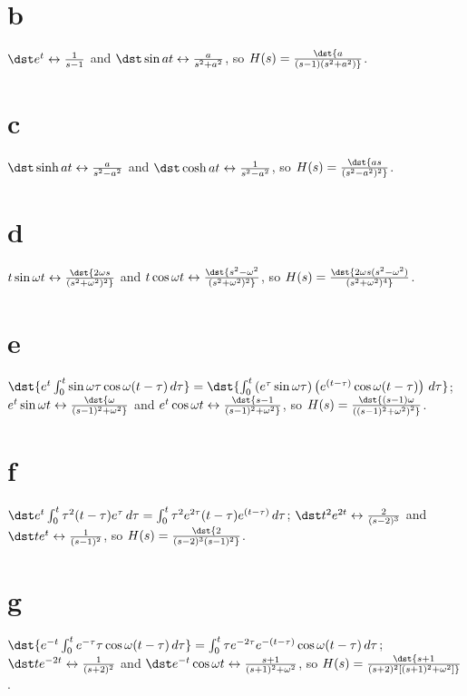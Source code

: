 \documentclass[dvips]{book}
\numberwithin{example}{section}
\numberwithin{equation}{section}
\numberwithin{theorem}{section}
\numberwithin{table}{section}
\numberwithin{figure}{section}
\begin{document}
\part{b}  $\dst e^t\leftrightarrow{1\over s-1}$ and
$\dst\sin at\leftrightarrow{a\over s^2+a^2}$, so
$H(s)=\dst{a\over(s-1)(s^2+a^2)}$.

\part{c}   $\dst\sinh at\leftrightarrow{a\over s^2-a^2}$ and
$\dst\cosh at\leftrightarrow{1\over s^2-a^2}$, so
$H(s)=\dst{as\over(s^2-a^2)^2}$.

\part{d}
 $t\sin\omega t\leftrightarrow\dst{2\omega
s\over(s^2+\omega^2)^2}$ and $t\cos\omega
t\leftrightarrow\dst{s^2-\omega^2\over(s^2+\omega^2)^2}$, so
$H(s)=\dst{2\omega s (s^2-\omega^2)\over (s^2+\omega^2)^4}$.

\part{e}
 $\dst{e^t\int_0^t\sin\omega\tau\cos\omega
(t-\tau)\,d\tau}=\dst{\int_0^t
\left(e^\tau\sin\omega\tau\right)\left(e^{(t-\tau)}\cos\omega
(t-\tau)\right)\,d\tau}$; $e^t\sin\omega
t\leftrightarrow\dst{\omega\over(s-1)^2+\omega^2}$ and $e^t\cos\omega
t\leftrightarrow\dst{s-1\over(s-1)^2+\omega^2}$, so
$H(s)=\dst{(s-1)\omega\over\left((s-1)^2+\omega^2\right)^2}$.

\part{f}
$\dst e^t\int_0^t\tau^2
(t-\tau)e^\tau\,d\tau=\int_0^t\tau^2e^{2\tau}(t-\tau)e^{(t-\tau)}\,d\tau$;
$\dst t^2e^{2t}\leftrightarrow{2\over(s-2)^3}$ and
$\dst te^t\leftrightarrow{1\over(s-1)^2}$, so
 $H(s)=\dst{2\over(s-2)^3 (s-1)^2}$.



\part{g}  $\dst{e^{-t}\int_0^t e^{-\tau}\tau\cos\omega
(t-\tau)\,d\tau}=
\int_0^t\tau e^{-2\tau}e^{-(t-\tau)}\cos\omega(t-\tau)\,d\tau$;
$\dst te^{-2t}\leftrightarrow{1\over(s+2)^2}$ and
$\dst e^{-t}\cos\omega
 t\leftrightarrow{s+1\over(s+1)^2+\omega^2}$, so
$H(s)=\dst{s+1\over(s+2)^2\left[(s+1)^2+
\omega^2\right]}$.
\end{document}
